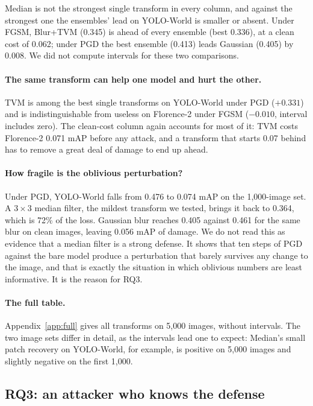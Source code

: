 \documentclass[11pt]{article}
\newcommand{\yw}{YOLO-World}
\newcommand{\fl}{Florence-2}
\begin{document}
Median is not the strongest single transform in every column, and against
the strongest one the ensembles' lead on \yw{} is smaller or absent. Under
FGSM, Blur+TVM (0.345) is ahead of every ensemble (best 0.336), at a clean
cost of 0.062; under PGD the best ensemble (0.413) leads Gaussian (0.405) by
0.008. We did not compute intervals for these two comparisons.

\paragraph{The same transform can help one model and hurt the other.}
TVM is among the best single transforms on \yw{} under PGD ($+0.331$) and is
indistinguishable from useless on \fl{} under FGSM ($-0.010$, interval
includes zero). The clean-cost column again accounts for most of it: TVM
costs \fl{} 0.071 mAP before any attack, and a transform that starts 0.07
behind has to remove a great deal of damage to end up ahead.

\paragraph{How fragile is the oblivious perturbation?} Under PGD, \yw{}
falls from 0.476 to 0.074 mAP on the 1{,}000-image set. A $3\times3$ median
filter, the mildest transform we tested, brings it back to 0.364, which is
72\% of the loss. Gaussian blur reaches 0.405 against 0.461 for the same
blur on clean images, leaving 0.056 mAP of damage. We do not read this as
evidence that a median filter is a strong defense. It shows that ten steps
of PGD against the bare model produce a perturbation that barely survives
any change to the image, and that is exactly the situation in which
oblivious numbers are least informative. It is the reason for RQ3.

\paragraph{The full table.} Appendix~\ref{app:full} gives all transforms on
5{,}000 images, without intervals. The two image sets differ in detail, as the intervals lead one to
expect: Median's small patch recovery on \yw{}, for example, is positive on
5{,}000 images and slightly negative on the first 1{,}000.

\subsection{RQ3: an attacker who knows the defense}
\label{sec:adaptive}
\end{document}
